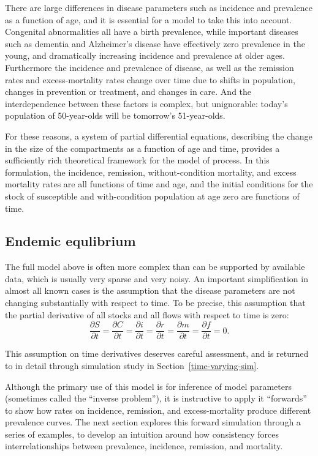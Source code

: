 There are large differences in disease parameters such as incidence and prevalence as a function of age, and it is essential for a model to take this into account.  Congenital abnormalities all have a birth prevalence, while important diseases such as dementia and Alzheimer's disease have effectively zero prevalence in the young, and dramatically increasing incidence and prevalence at older ages. Furthermore the incidence and prevalence of disease, as well as the remission rates and excess-mortality rates change over time due to shifts in population, changes in prevention or treatment, and changes in care. And the interdependence between these factors is complex, but unignorable: today's population of 50-year-olds will be tomorrow's 51-year-olds.

For these reasons, a system of partial differential equations, describing the change in the size of the compartments as a function of age and time, provides a sufficiently rich theoretical framework for the model of process.  In this formulation, the incidence, remission, without-condition mortality, and excess mortality rates are all functions of time and age, and the initial conditions for the stock of susceptible and with-condition population at age zero are functions of time.

\subsection{Endemic equlibrium}
\label{theory-forward_sim-compartmental_model-simplying_assumptions}

The full model above is often more complex than can be supported by available data, which is usually very sparse and very noisy.  An important simplification in almost all known cases is the assumption that the disease parameters are not changing substantially with respect to time. To be precise, this assumption that the partial derivative of all stocks and all flows with respect to time is zero:
\[
\frac{\partial S}{\partial t}
=
\frac{\partial C}{\partial t}
=
\frac{\partial i}{\partial t}
=
\frac{\partial r}{\partial t}
=
\frac{\partial m}{\partial t}
=
\frac{\partial f}{\partial t}
=
0.
\]

This assumption on time derivatives deserves careful assessment, and is returned to in detail through simulation study in Section~\ref{time-varying-sim}.

Although the primary use of this model is for inference of model parameters (sometimes called the ``inverse problem''), it is instructive to apply it ``forwards'' to show how rates on incidence, remission, and excess-mortality produce different prevalence curves. The next section explores this forward simulation through a series of examples, to develop an intuition around how consistency forces interrelationships between prevalence, incidence, remission, and mortality.


